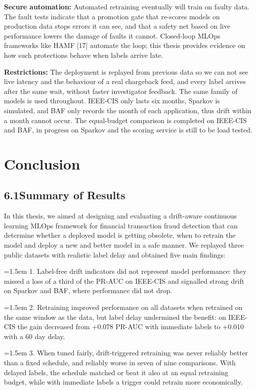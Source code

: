 \documentclass[11pt,letterpaper]{report}
\newcommand{\listitem}[1]{\par\hangindent=1.5em\hangafter=1 #1\par}
\begin{document}
\textbf{Secure automation:} Automated retraining eventually will train on faulty data. The fault tests indicate that a promotion gate that re-scores models on production data stops errors it can see, and that a safety net based on live performance lowers the damage of faults it cannot. Closed-loop MLOps frameworks like HAMF [17] automate the loop; this thesis provides evidence on how such protections behave when labels arrive late.

\textbf{Restrictions:} The deployment is replayed from previous data so we can not see live latency and the behaviour of a real chargeback feed, and every label arrives after the same wait, without faster investigator feedback. The same family of models is used throughout. IEEE-CIS only lasts six months, Sparkov is simulated, and BAF only records the month of each application, thus drift within a month cannot occur. The equal-budget comparison is completed on IEEE-CIS and BAF, in progress on Sparkov and the scoring service is still to be load tested.

\setcounter{chapter}{5}
\chapter{Conclusion}

\section*{6.1\quad Summary of Results}

In this thesis, we aimed at designing and evaluating a drift-aware continuous learning MLOps framework for financial transaction fraud detection that can determine whether a deployed model is getting obsolete, when to retrain the model and deploy a new and better model in a safe manner. We replayed three public datasets with realistic label delay and obtained five main findings:

\listitem{1. Label-free drift indicators did not represent model performance: they missed a loss of a third of the PR-AUC on IEEE-CIS and signalled strong drift on Sparkov and BAF, where performance did not drop.}

\listitem{2. Retraining improved performance on all datasets when retrained on the same window as the data, but label delay undermined the benefit: on IEEE-CIS the gain decreased from +0.078 PR-AUC with immediate labels to +0.010 with a 60 day delay.}

\listitem{3. When tuned fairly, drift-triggered retraining was never reliably better than a fixed schedule, and reliably worse in seven of nine comparisons. With delayed labels, the schedule matched or beat it also at an equal retraining budget, while with immediate labels a trigger could retrain more economically.}
\end{document}
